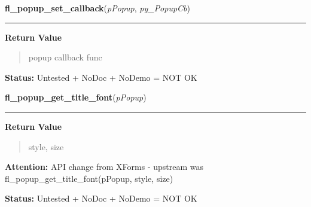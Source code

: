 \hspace{.8\funcindent}\begin{boxedminipage}{\funcwidth}

    \raggedright \textbf{fl\_popup\_set\_callback}(\textit{pPopup}, \textit{py\_PopupCb})

    \vspace{-1.5ex}

    \rule{\textwidth}{0.5\fboxrule}
\setlength{\parskip}{2ex}
\setlength{\parskip}{1ex}
      \textbf{Return Value}
    \vspace{-1ex}

      \begin{quote}
      popup callback func

      \end{quote}

\textbf{Status:} Untested + NoDoc + NoDemo = NOT OK



    \end{boxedminipage}

    \label{xformslib:flpopup:fl_popup_get_title_font}

    \vspace{0.5ex}

\hspace{.8\funcindent}\begin{boxedminipage}{\funcwidth}

    \raggedright \textbf{fl\_popup\_get\_title\_font}(\textit{pPopup})

    \vspace{-1.5ex}

    \rule{\textwidth}{0.5\fboxrule}
\setlength{\parskip}{2ex}
\setlength{\parskip}{1ex}
      \textbf{Return Value}
    \vspace{-1ex}

      \begin{quote}
      style, size

      \end{quote}

\textbf{Attention:} API change from XForms - upstream was fl\_popup\_get\_title\_font(pPopup, 
style, size)



\textbf{Status:} Untested + NoDoc + NoDemo = NOT OK



    \end{boxedminipage}

